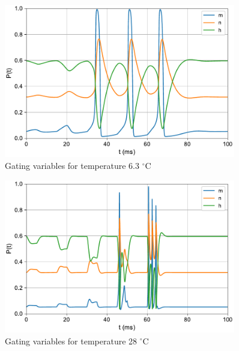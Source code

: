 \documentclass{scrartcl}
\begin{document}
\newpage
\begin{figure}[h]
	\centering
	\includegraphics[width=0.9\textwidth]{figures/gatingvars_temp6.3.pdf}
	\caption{Gating variables for temperature 6.3 $^{\circ}$C}
	\label{fig:gatingvars_temp6_3}
\end{figure}
\begin{figure}[h!]
	\centering
	\includegraphics[width=0.9\textwidth]{figures/gatingvars_temp28.pdf}
	\caption{Gating variables for temperature 28 $^{\circ}$C}
	\label{fig:gatingvars_temp28}
\end{figure}
\end{document}
